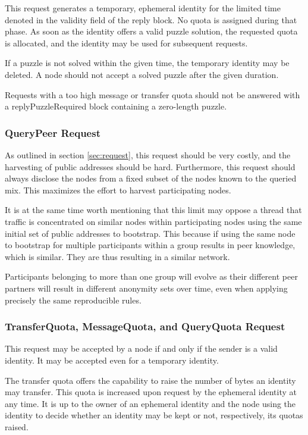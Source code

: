 This request generates a temporary, ephemeral identity for the limited time denoted in the validity field of the reply block. No quota is assigned during that phase. As soon as the identity offers a valid puzzle solution, the requested quota is allocated, and the identity may be used for subsequent requests.

If a puzzle is not solved within the given time, the temporary identity may be deleted. A node should not accept a solved puzzle after the given duration. 

Requests with a too high message or transfer quota should not be answered with a replyPuzzleRequired block containing a zero-length puzzle.

\subsubsection{QueryPeer Request}
As outlined in section \ref{sec:request}, this request should be very costly, and the harvesting of public addresses should be hard. Furthermore, this request should always disclose the nodes from a fixed subset of the nodes known to the queried mix. This maximizes the effort to harvest participating nodes.

It is at the same time worth mentioning that this limit may oppose a thread that traffic is concentrated on similar nodes within participating nodes using the same initial set of public addresses to bootstrap. This because if using the same node to bootstrap for multiple participants within a group results in peer knowledge, which is similar. They are thus resulting in a similar network. 

Participants belonging to more than one group will evolve as their different peer partners will result in different anonymity sets over time, even when applying precisely the same reproducible rules.

\subsubsection{TransferQuota, MessageQuota,  and QueryQuota Request}
This request may be accepted by a node if and only if the sender is a valid identity. It may be accepted even for a temporary identity.

The transfer quota offers the capability to raise the number of bytes an identity may transfer. This quota is increased upon request by the ephemeral identity at any time. It is up to the owner of an ephemeral identity and the node using the identity to decide whether an identity may be kept or not, respectively, its quotas raised.

